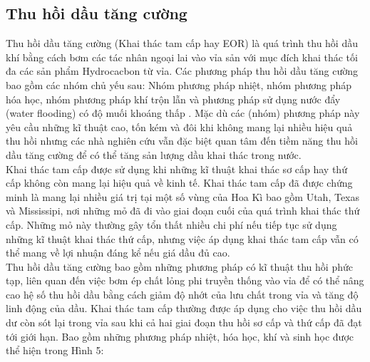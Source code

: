 \documentclass[12pt,a4paper]{article}
\begin{document}
	\subsection{Thu hồi dầu tăng cường}
Thu hồi dầu tăng cường (Khai thác tam cấp hay EOR) là quá trình thu hồi dầu khí bằng cách bơm các tác nhân ngoại lai vào vỉa sản với mục đích khai thác tối đa các sản phẩm Hydrocacbon từ vỉa. Các phương pháp thu hồi dầu tăng cường bao gồm các nhóm chủ yếu sau: Nhóm phương pháp nhiệt, nhóm phương pháp hóa học, nhóm phương pháp khí trộn lẫn và phương pháp sử dụng nước đẩy (water flooding) có độ muối khoáng thấp \cite{green1998enhanced}. Mặc dù các (nhóm) phương pháp này yêu cầu những kĩ thuật cao, tốn kém và đôi khi không mang lại nhiều hiệu quả thu hồi nhưng các nhà nghiên cứu vẫn đặc biệt quan tâm đến tiềm năng thu hồi dầu tăng cường để có thể tăng sản lượng dầu khai thác trong nước.\\
Khai thác tam cấp được sử dụng khi những kĩ thuật khai thác sơ cấp hay thứ cấp không còn mang lại hiệu quả về kinh tế. Khai thác tam cấp đã được chứng minh là mang lại nhiều giá trị tại một số vùng của Hoa Kì bao gồm Utah, Texas và Mississipi, nơi những mỏ đã đi vào giai đoạn cuối của quá trình khai thác thứ cấp. Những mỏ này thường gây tổn thất nhiều chi phí nếu tiếp tục sử dụng những kĩ thuật khai thác thứ cấp, nhưng việc áp dụng khai thác tam cấp vẫn có thể mang về lợi nhuận đáng kể nếu giá dầu đủ cao.\\
Thu hồi dầu tăng cường bao gồm những phương pháp có kĩ thuật thu hồi phức tạp, liên quan đến việc bơm ép chất lỏng phi truyền thống vào vỉa để có thể nâng cao hệ số thu hồi dầu bằng cách giảm độ nhớt của lưu chất trong vỉa và tăng độ linh động của dầu. Khai thác tam cấp thường được áp dụng cho việc thu hồi dầu dư còn sót lại trong vỉa sau khi cả hai giai đoạn thu hồi sơ cấp và thứ cấp đã đạt tới giới hạn. Bao gồm những phương pháp nhiệt, hóa học, khí và sinh học được thể hiện trong Hình 5:
\clearpage
\end{document}
